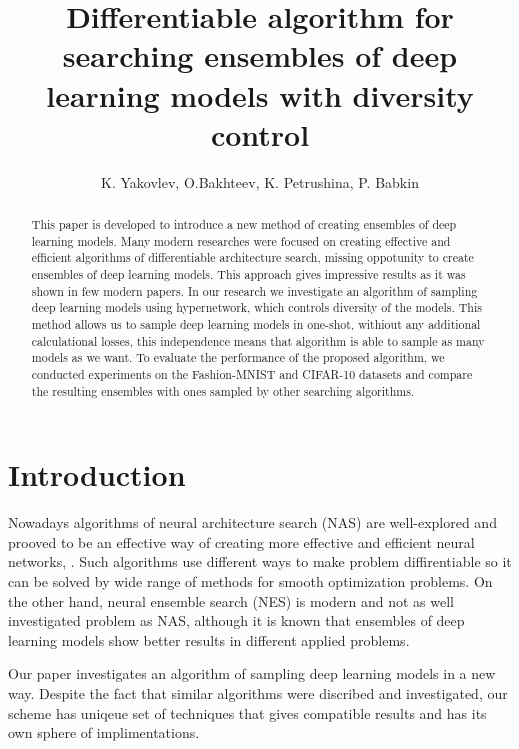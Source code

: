 \documentclass{article}
\title{Differentiable algorithm for searching ensembles of deep learning models with diversity control}
\author{K. Yakovlev, O.Bakhteev, K. Petrushina, P. Babkin
}
\date{}
\begin{document}
\maketitle

\begin{abstract}
	
This paper is developed to introduce a new method of creating ensembles of deep learning models. 
Many modern researches were focused on creating effective and efficient algorithms of differentiable architecture search,
missing oppotunity to create ensembles of deep learning models. This approach gives impressive results
as it was shown in few modern papers. In our research we investigate an algorithm of sampling deep learning models using
hypernetwork, which controls diversity of the models. This method allows us to sample deep learning models in one-shot,
withiout any additional calculational losses, this independence means that algorithm is able to sample as many models
as we want. To evaluate the performance of the proposed algorithm, we conducted experiments on the Fashion-MNIST and CIFAR-10
datasets and compare the resulting ensembles with ones sampled by other searching algorithms.

\end{abstract}



\section{Introduction}

Nowadays algorithms of neural architecture search (NAS) are well-explored and prooved to be an effective way of creating
more effective and efficient neural networks, \citep{darts, robustify, xnas}. Such algorithms use different ways to make problem diffirentiable so it can
be solved by wide range of methods for smooth optimization problems. On the other hand, neural ensemble search (NES) is
modern and not as well investigated problem as NAS, although it is known that ensembles of deep learning models show better
results in different applied problems.

Our paper investigates an algorithm of sampling deep learning models in a new way. Despite the fact that similar algorithms
were discribed and investigated, our scheme has uniqeue set of techniques that gives compatible results and has its own sphere
of implimentations.
\end{document}
